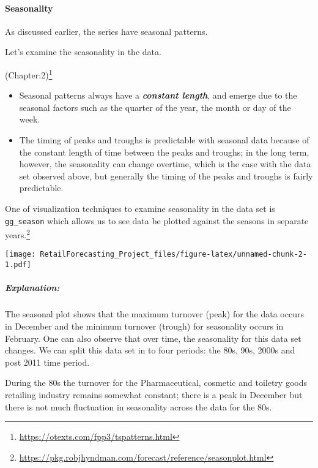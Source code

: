 \documentclass[
]{article}
\providecommand{\tightlist}{%
  \setlength{\itemsep}{0pt}\setlength{\parskip}{0pt}}
\begin{document}
\hypertarget{seasonality}{%
\paragraph{Seasonality}\label{seasonality}}

As discussed earlier, the series have seasonal patterns.

Let's examine the seasonality in the data.

(Chapter:2)\footnote{\url{https://otexts.com/fpp3/tspatterns.html}}

\begin{itemize}
\tightlist
\item
  Seasonal patterns always have a \textbf{\emph{constant length}}, and
  emerge due to the seasonal factors such as the quarter of the year,
  the month or day of the week.
\item
  The timing of peaks and troughs is predictable with seasonal data
  because of the constant length of time between the peaks and troughs;
  in the long term, however, the seasonality can change overtime, which
  is the case with the data set observed above, but generally the timing
  of the peaks and troughs is fairly predictable.
\end{itemize}

One of visualization techniques to examine seasonality in the data set
is \texttt{gg\_season} which allows us to see data be plotted against
the seasons in separate years.\footnote{\url{https://pkg.robjhyndman.com/forecast/reference/seasonplot.html}}

\texttt{[image: RetailForecasting\_Project\_files/figure-latex/unnamed-chunk-2-1.pdf]}

\hypertarget{explanation}{%
\subparagraph{Explanation:}\label{explanation}}

The seasonal plot shows that the maximum turnover (peak) for the data
occurs in December and the minimum turnover (trough) for seasonality
occurs in February. One can also observe that over time, the seasonality
for this data set changes. We can split this data set in to four
periods: the 80s, 90s, 2000s and post 2011 time period.

During the 80s the turnover for the Pharmaceutical, cosmetic and
toiletry goods retailing industry remains somewhat constant; there is a
peak in December but there is not much fluctuation in seasonality across
the data for the 80s.
\end{document}
